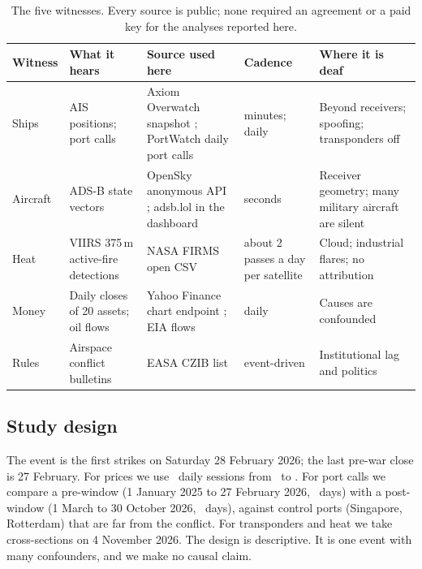 \documentclass[10pt,twocolumn,letterpaper]{article}
\begin{document}
\begin{table}[t]
\centering\small
\caption{The five witnesses. Every source is public; none required an agreement or a paid key for the analyses reported here.}\label{tab:witness}
\begin{tabular}{@{}>{\raggedright\arraybackslash}p{2.2cm}>{\raggedright\arraybackslash}p{3.6cm}>{\raggedright\arraybackslash}p{4.6cm}>{\raggedright\arraybackslash}p{1.9cm}>{\raggedright\arraybackslash}p{3.9cm}@{}}
\toprule
Witness & What it hears & Source used here & Cadence & Where it is deaf\\\midrule
Ships & AIS positions; port calls & Axiom Overwatch snapshot \citep{overwatch}; PortWatch daily port calls \citep{portwatch,arslanalp2021imf} & minutes; daily & Beyond receivers; spoofing; transponders off\\
Aircraft & ADS-B state vectors & OpenSky anonymous API \citep{opensky}; adsb.lol in the dashboard \citep{adsblol} & seconds & Receiver geometry; many military aircraft are silent\\
Heat & VIIRS 375\,m active-fire detections & NASA FIRMS open CSV \citep{firms} & about 2 passes a day per satellite & Cloud; industrial flares; no attribution\\
Money & Daily closes of 20 assets; oil flows & Yahoo Finance chart endpoint \citep{yahoofinance}; EIA flows \citep{eia2026steo} & daily & Causes are confounded\\
Rules & Airspace conflict bulletins & EASA CZIB list \citep{easa2026czib} & event-driven & Institutional lag and politics\\\bottomrule
\end{tabular}
\end{table}

\subsection{Study design}
The event is the first strikes on Saturday 28 February 2026; the last pre-war close is 27 February. For prices we use \NSessions\ daily sessions from \RangeStart\ to \RangeEnd. For port calls we compare a pre-window (1 January 2025 to 27 February 2026, \PortDaysPre\ days) with a post-window (1 March to 30 October 2026, \PortDaysPost\ days), against control ports (Singapore, Rotterdam) that are far from the conflict. For transponders and heat we take cross-sections on 4 November 2026. The design is descriptive. It is one event with many confounders, and we make no causal claim.
\end{document}
